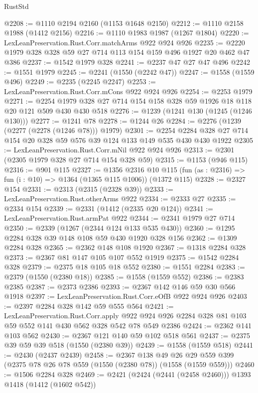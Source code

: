 \begin{lexlean}{RustStd}
\begin{coremodule}
@2208 := @1110 @2194 @2160 (@1153 @1648 @2150)
@2212 := @1110 @2158 @1988 (@1412 @2156)
@2216 := @1110 @1983 @1987 (@1267 @1804)
@2220 := LexLeanPreservation.Rust.Corr.matchArms @922 @924 @926
@2235 := @2220 @1979 @328 @328 @59 @27 @714 @113 @154 @159 @496 @1927 @20 @462 @47 @386
@2237 := @1542 @1979 @328
@2241 := @2237 @47 @27 @47 @496
@2242 := @1551 @1979
@2245 := @2241 (@1550 (@2242 @47))
@2247 := @1558 (@1559 @496)
@2249 := @2235 (@2245 @2247)
@2253 := LexLeanPreservation.Rust.Corr.mCons @922 @924 @926
@2254 := @2253 @1979
@2271 := @2254 @1979 @328 @27 @714 @154 @158 @328 @59 @1926 @18 @118 @20 @121 @509 @430 @430 @518
@2276 := @1239 (@1241 @130 (@1245 (@1246 @130)))
@2277 := @1241 @78
@2278 := @1244 @26
@2284 := @2276 (@1239 (@2277 (@2278 (@1246 @78))) @1979)
@2301 := @2254 @2284 @328 @27 @714 @154 @20 @328 @59 @576 @39 @124 @133 @149 @535 @430 @430 @1922
@2305 := LexLeanPreservation.Rust.Corr.mNil @922 @924 @926
@2313 := @2301 (@2305 @1979 @328 @27 @714 @154 @328 @59)
@2315 := @1153 (@946 @115)
@2316 := @901 @115
@2327 := @1356
    @2316
    @10
    @115
    (fun (as : @2316) => fun (i : @10) => @1364 (@1365 @115 @1006))
    (@1372 @115)
@2328 := @2327 @154
@2331 := @2313 (@2315 (@2328 @39))
@2333 := LexLeanPreservation.Rust.otherArms @922
@2334 := @2333 @27
@2335 := @2334 @154
@2339 := @2331 (@1412 (@2335 @20 @124))
@2341 := LexLeanPreservation.Rust.armPat @922
@2344 := @2341 @1979 @27 @714
@2350 := @2339 (@1267 (@2344 @124 @133 @535 @430))
@2360 := @1295 @2284 @328 @39 @148 @108 @59 @430 @1920 @328 @156
@2362 := @1309 @2284 @328
@2365 := @2362 @148 @108 @1920
@2367 := @1318 @2284 @328
@2373 := @2367 @81 @147 @105 @107 @552 @1919
@2375 := @1542 @2284 @328
@2379 := @2375 @18 @105 @18 @552
@2380 := @1551 @2284
@2383 := @2379 (@1550 (@2380 @18))
@2385 := @1558 (@1559 @552)
@2386 := @2383 @2385
@2387 := @2373 @2386
@2393 := @2367 @142 @146 @59 @30 @566 @1918
@2397 := LexLeanPreservation.Rust.Corr.eOfB @922 @924 @926
@2403 := @2397 @2284 @328 @142 @59 @555 @564
@2421 := LexLeanPreservation.Rust.Corr.apply
    @922
    @924
    @926
    @2284
    @328
    @81
    @103
    @59
    @552
    @141
    @430
    @562
    @328
    @542
    @78
    @549
    @2386
@2424 := @2362 @141 @103 @562
@2430 := @2367 @121 @140 @59 @102 @518 @561
@2437 := @2375 @39 @59 @39 @518 (@1550 (@2380 @39))
@2439 := @1558 (@1559 @518)
@2441 := @2430 (@2437 @2439)
@2458 := @2367
    @138
    @49
    @26
    @29
    @559
    @399
    (@2375 @78 @26 @78 @559 (@1550 (@2380 @78)) (@1558 (@1559 @559)))
@2460 := @1506 @2284 @328
@2469 := @2421 (@2424 (@2441 (@2458 @2460))) @1393 @1418 (@1412 (@1602 @542))

\end{coremodule}
\end{lexlean}
